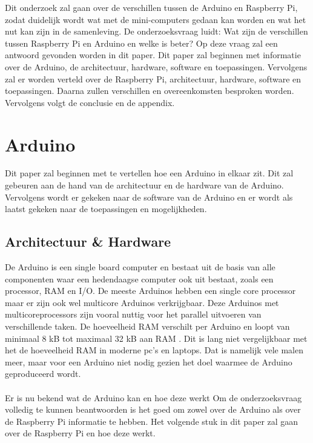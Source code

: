 \documentclass[a4paper, dutch, abstract=true]{scrartcl}
\begin{document}
Dit onderzoek zal gaan over de verschillen tussen de Arduino en Raspberry Pi, zodat duidelijk wordt
wat met de mini-computers gedaan kan worden en wat het nut kan zijn in de samenleving.
De onderzoeksvraag luidt: Wat zijn de verschillen tussen Raspberry Pi en Arduino en welke is beter?
Op deze vraag zal een antwoord gevonden worden in dit paper.
Dit paper zal beginnen met informatie over de Arduino, de architectuur, hardware, software en
toepassingen.
Vervolgens zal er worden verteld over de Raspberry Pi, architectuur, hardware, software en
toepassingen.
Daarna zullen verschillen en overeenkomsten besproken worden.
Vervolgens volgt de conclusie en de appendix.

\section{Arduino}
Dit paper zal beginnen met te vertellen hoe een Arduino in elkaar zit.
Dit zal gebeuren aan de hand van de architectuur en de hardware van de Arduino.
Vervolgens wordt er gekeken naar de software van de Arduino en er wordt als laatst gekeken naar de
toepassingen en mogelijkheden.

\subsection{Architectuur \& Hardware}
De Arduino is een single board computer en bestaat uit de basis van alle componenten waar een
hedendaagse computer ook uit bestaat, zoals een processor, RAM en I/O.
De meeste Arduinos hebben een single core processor maar er zijn ook wel multicore Arduinos
verkrijgbaar.
Deze Arduinos met multicoreprocessors zijn vooral nuttig voor het parallel uitvoeren van
verschillende taken.
De hoeveelheid RAM verschilt per Arduino en loopt van minimaal 8 kB tot maximaal 32 kB aan RAM
\cite{arduino2019products}.
Dit is lang niet vergelijkbaar met het de hoeveelheid RAM in moderne pc's en laptops.
Dat is namelijk vele malen meer, maar voor een Arduino niet nodig gezien het doel waarmee de Arduino
geproduceerd wordt.

\paragraph*{}
Er is nu bekend wat de Arduino kan en hoe deze werkt
Om de onderzoeksvraag volledig te kunnen beantwoorden is het goed om zowel over de Arduino als over
de Raspberry Pi informatie te hebben.
Het volgende stuk in dit paper zal gaan over de Raspberry Pi en hoe deze werkt.
\end{document}
